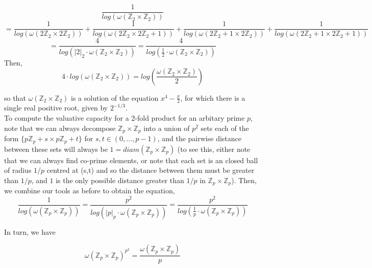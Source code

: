 \[
\frac{1}{log(\omega(\mathbb{Z}_2 \times \mathbb{Z}_2))} \]
\[ = \frac{1}{log(\omega(2\mathbb{Z}_2 \times 2\mathbb{Z}_2))} + \frac{1}{log(\omega(2\mathbb{Z}_2 \times 2\mathbb{Z}_2 +1))} + \frac{1}{log(\omega(2\mathbb{Z}_2+1 \times 2\mathbb{Z}_2))} + \frac{1}{log(\omega(2\mathbb{Z}_2+1 \times 2\mathbb{Z}_2+1))}\]
\[ = \frac{4}{log(\lvert 2 \rvert_2 \cdot \omega(\mathbb{Z}_2 \times \mathbb{Z}_2))} = \frac{4}{log(\frac{1}{2} \cdot \omega(\mathbb{Z}_2 \times \mathbb{Z}_2))}\]%
Then,
\[4\cdot log(\omega(\mathbb{Z}_2 \times \mathbb{Z}_2)) =log(\frac{\omega(\mathbb{Z}_2 \times \mathbb{Z}_2)}{2}) \]



so that ${\omega(\mathbb{Z}_2 \times \mathbb{Z}_2)}$ is a solution of the equation $x^4 - \frac{x}{2}$, for which there is a single real positive root, given by $2^{-1/3}$.\\


To compute the valuative capacity for a $2$-fold product for an arbitary prime $p$, note that we can always decompose $\mathbb{Z}_p \times \mathbb{Z}_p$ into a union of $p^2$ sets each of the form $\{p\mathbb{Z}_p+s \times p\mathbb{Z}_p +t\}$ for $s,t \in (0,\ldots, p-1)$, and the pairwise distance between these sets will always be $1 = diam(\mathbb{Z}_p \times \mathbb{Z}_p)$ (to see this, either note that we can always find co-prime elements, or note that each set is an closed ball of radius $1/p$ centred at (s,t) and so the distance between them must be greater than $1/p$, and $1$ is the only possible distance greater than $1/p$ in $\mathbb{Z}_p \times \mathbb{Z}_p$).  Then, we combine our tools as before to obtain the equation,\\

\[\frac{1}{log(\omega(\mathbb{Z}_p \times \mathbb{Z}_p))} = \frac{p^2}{log(\lvert p \rvert_p \cdot \omega(\mathbb{Z}_p \times \mathbb{Z}_p))} =  \frac{p^2}{log(\frac{1}{p} \cdot \omega(\mathbb{Z}_p \times \mathbb{Z}_p))}    \]

In turn, we have 

\[ \omega(\mathbb{Z}_p \times \mathbb{Z}_p)^{p^2} =  \frac{\omega(\mathbb{Z}_p \times \mathbb{Z}_p)}{p}  \]

